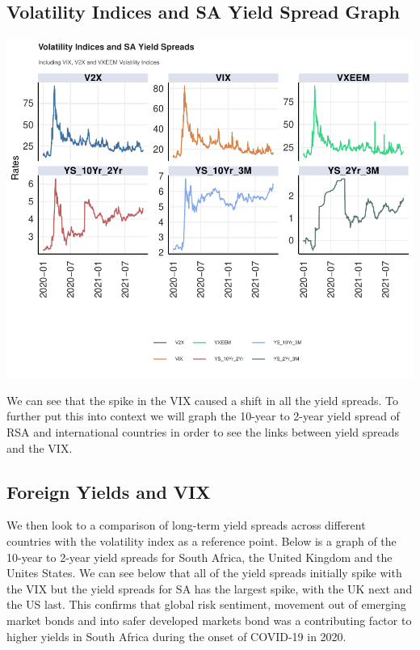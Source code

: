 \documentclass[11pt,preprint, authoryear]{elsarticle}
\numberwithin{equation}{section}
\numberwithin{figure}{section}
\numberwithin{table}{section}
\begin{document}
\hypertarget{volatility-indices-and-sa-yield-spread-graph}{%
\subsection{Volatility Indices and SA Yield Spread
Graph}\label{volatility-indices-and-sa-yield-spread-graph}}

\includegraphics{Question2_files/figure-latex/unnamed-chunk-13-1.pdf}

We can see that the spike in the VIX caused a shift in all the yield
spreads. To further put this into context we will graph the 10-year to
2-year yield spread of RSA and international countries in order to see
the links between yield spreads and the VIX.

\hypertarget{foreign-yields-and-vix}{%
\subsection{Foreign Yields and VIX}\label{foreign-yields-and-vix}}

We then look to a comparison of long-term yield spreads across different
countries with the volatility index as a reference point. Below is a
graph of the 10-year to 2-year yield spreads for South Africa, the
United Kingdom and the Unites States. We can see below that all of the
yield spreads initially spike with the VIX but the yield spreads for SA
has the largest spike, with the UK next and the US last. This confirms
that global risk sentiment, movement out of emerging market bonds and
into safer developed markets bond was a contributing factor to higher
yields in South Africa during the onset of COVID-19 in 2020.
\end{document}
